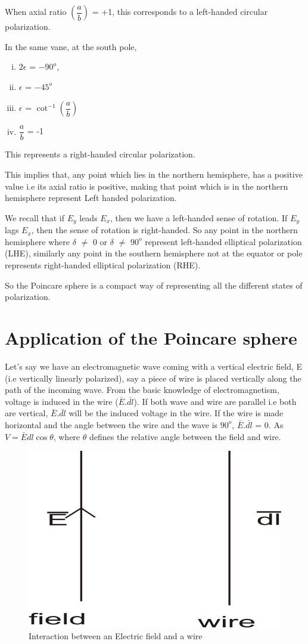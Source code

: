 When axial ratio $(\dfrac{a}{b})$ = +1, this corresponds to a left-handed circular polarization.

In the same vane, at the south pole,
\begin{enumerate}[(i)]
\item	$2\epsilon$ = $-90^{o}$, 
\item $\epsilon$ = $-45^{o}$
\item $\epsilon$ = $\cot^{-1}(\dfrac{a}{b})$
\item $\dfrac{a}{b}$ = -1
\end{enumerate}	
This represents a right-handed circular polarization.

This implies that, any point which lies in the northern hemisphere, has a positive value i.e its axial ratio is positive, making that point which is in the northern hemisphere represent Left handed polarization.

We recall that if $E_{y}$ leads $E_{x}$, then we have a left-handed sense of rotation. If $E_{y}$ lags $E_{x}$, then the sense of rotation is right-handed. So any point in the northern hemisphere where $\delta$ $\neq$ 0 or $\delta$ $\neq$ $90^{o}$ represent left-handed elliptical polarization  (LHE), similarly any point in the southern hemisphere not at the equator or pole represents right-handed elliptical polarization (RHE).

So the Poincare sphere is a compact way of representing all the different states of polarization.

\section{Application of the Poincare sphere}
Let's say we have an electromagnetic wave coming with a vertical electric field, E (i.e vertically linearly polarized), say a piece of wire is placed vertically along the path of the incoming wave. From the basic knowledge of electromagnetism, voltage is induced in the wire ($\bar{E}$.$\bar{dl}$). If both wave and wire are parallel i.e both are vertical, $\bar{E}$.$\bar{dl}$ will be the induced voltage in the wire. If the wire is made horizontal and the angle between the wire and the wave is $90^{o}$, $\bar{E}$.$\bar{dl}$ = 0. As $ V = \bar{E}dl\cos\theta $, where $ \theta $ defines the relative angle between the field and wire.
\begin{figure}[h]
\centering
\includegraphics[width=.7\linewidth]{./graphics/interact}
\caption{Interaction between an Electric field and a wire}
\label{fig:interact}
\end{figure}

